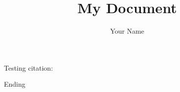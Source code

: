\documentclass[a4paper, twoside, 11pt]{book}
\begin{document}
\title{My Document}
\author{Your Name}

Testing citation: 
\cite{sobonTimberFrameConstruction1984}

Ending


\end{document}
